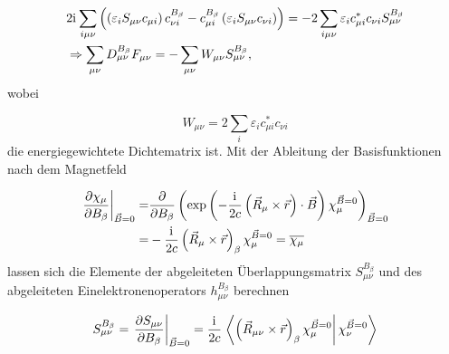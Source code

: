      \begin{equation}\label{eq:enweightd}
     \begin{aligned}
     &2\mathrm{i}\mkern1mu\sum_{i\mu\nu}\left(\left(\varepsilon_i S_{\mu\nu} c_{\mu i}\right) c_{\nu i}^{B_\beta} - c_{\mu i}^{B_\beta} \left(\varepsilon_i S_{\mu\nu} c_{\nu i}\right)\right)=-2\sum_{i\mu\nu}\varepsilon_i c_{\mu i}^*c_{\nu i}S_{\mu\nu}^{B_\beta}\\
     &\Rightarrow \sum_{\mu\nu}D_{\mu\nu}^{B_\beta}F_{\mu\nu}=-\sum_{\mu\nu}W_{\mu\nu} S_{\mu\nu}^{B_\beta},
     \end{aligned}
     \end{equation}
     wobei
     
     \begin{equation}
     W_{\mu\nu}=2\sum_{i}\varepsilon_i c_{\mu i}^*c_{\nu i}
     \end{equation}
     die energiegewichtete Dichtematrix ist.\supercite{pople1979derivative} Mit der Ableitung der Basisfunktionen nach dem Magnetfeld
     
     \begin{equation}
     \begin{aligned}
     \left.\frac{\partial \chi_\mu}{\partial B_\beta}\right\vert_{\vec{B}=0}=&\frac{\partial}{\partial B_\beta}\left(\exp\left(-\frac{\mathrm{i}\mkern1mu}{2c}\left(\vec{R}_\mu\times\vec{r} \right)\cdot \vec{B}\right)\chi_\mu^{\vec{B}=0}\right)_{\vec{B}=0}\\
     =&-\frac{\mathrm{i}\mkern1mu}{2c}\left(\vec{R}_\mu\times\vec{r}\right)_\beta\chi_\mu^{\vec{B}=0}=\overline{\chi_\mu}
     \end{aligned}
     \end{equation}
     lassen sich die Elemente der abgeleiteten Überlappungsmatrix $S_{\mu\nu}^{B_\beta}$ und des abgeleiteten Einelektronenoperators $h_{\mu\nu}^{B_\beta}$ berechnen
     
     \begin{equation}
     S_{\mu\nu}^{B_\beta}=\left.\frac{\partial S_{\mu\nu}}{\partial B_\beta} \right\vert_{\vec{B}=0}=\frac{\mathrm{i}\mkern1mu}{2c}\left.\left\langle\left(\vec{R}_{\mu\nu}\times\vec{r}\right)_\beta\chi_\mu^{\vec{B}=0}\right\vert\chi_\nu^{\vec{B}=0}\right\rangle
     \end{equation}
  	 
